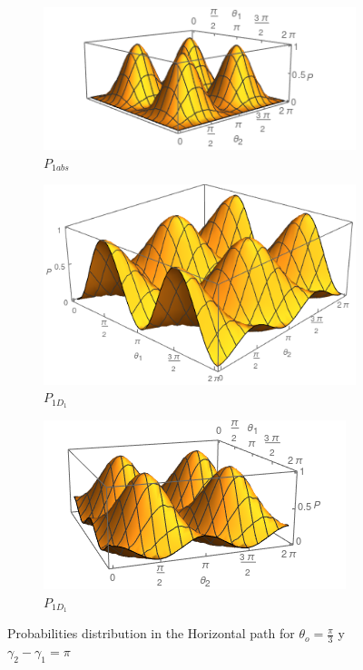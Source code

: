 \documentclass{book}
\begin{document}
\begin{figure}[H]
\centering
\begin{subfigure}[b]{0.45\linewidth}
\includegraphics[width=\linewidth]{images/P11abs.png}
\caption{$P_{1abs}$}
\label{fig:BS1}
\end{subfigure}
\begin{subfigure}[b]{0.45\linewidth}
\includegraphics[width=\linewidth ,height=3 cm]{images/P11d1.png}
\caption{$P_{1D_{1}}$}
\label{fig:westminster_aerea}
\end{subfigure}
\begin{subfigure}[b]{0.45\linewidth}
\includegraphics[width=\linewidth]{images/P11d2.png}
\caption{$P_{1D_{1}}$}
\label{fig:BS1}
\end{subfigure}
\caption{Probabilities distribution in the Horizontal path for $\theta_{o}=\frac{\pi}{3}$ y $\gamma_{2}-\gamma_{1}=\pi$}
\label{P_bs2}
\end{figure}
\end{document}
